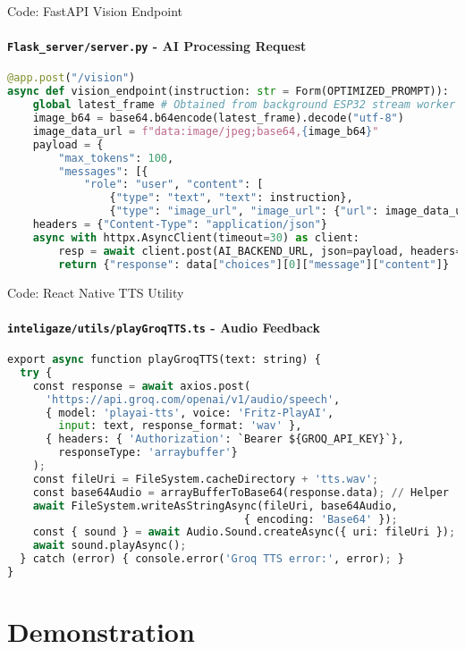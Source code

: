 \documentclass[10pt]{beamer}
\begin{document}
\begin{frame}[fragile]{Code: FastAPI Vision Endpoint}
    \framesubtitle{\texttt{Flask\_server/server.py} - AI Processing Request}
    \begin{lstlisting}[language=Python, caption=Sending Frame to AI]
@app.post("/vision")
async def vision_endpoint(instruction: str = Form(OPTIMIZED_PROMPT)):
    global latest_frame # Obtained from background ESP32 stream worker
    image_b64 = base64.b64encode(latest_frame).decode("utf-8")
    image_data_url = f"data:image/jpeg;base64,{image_b64}"
    payload = {
        "max_tokens": 100,
        "messages": [{
            "role": "user", "content": [
                {"type": "text", "text": instruction},
                {"type": "image_url", "image_url": {"url": image_data_url}}  ]  }]  }
    headers = {"Content-Type": "application/json"}
    async with httpx.AsyncClient(timeout=30) as client:
        resp = await client.post(AI_BACKEND_URL, json=payload, headers=headers)
        return {"response": data["choices"][0]["message"]["content"]}
    \end{lstlisting}
\end{frame}

\begin{frame}[fragile]{Code: React Native TTS Utility}
    \framesubtitle{\texttt{inteligaze/utils/playGroqTTS.ts} - Audio Feedback}
    \begin{lstlisting}[language=Python, caption=Calling Groq TTS API]
export async function playGroqTTS(text: string) {
  try {
    const response = await axios.post(
      'https://api.groq.com/openai/v1/audio/speech',
      { model: 'playai-tts', voice: 'Fritz-PlayAI', 
        input: text, response_format: 'wav' },
      { headers: { 'Authorization': `Bearer ${GROQ_API_KEY}`}, 
        responseType: 'arraybuffer'}
    );
    const fileUri = FileSystem.cacheDirectory + 'tts.wav';
    const base64Audio = arrayBufferToBase64(response.data); // Helper
    await FileSystem.writeAsStringAsync(fileUri, base64Audio, 
                                     { encoding: 'Base64' });
    const { sound } = await Audio.Sound.createAsync({ uri: fileUri });
    await sound.playAsync();
  } catch (error) { console.error('Groq TTS error:', error); }
}
    \end{lstlisting}
\end{frame}

\section{Demonstration}
\end{document}
